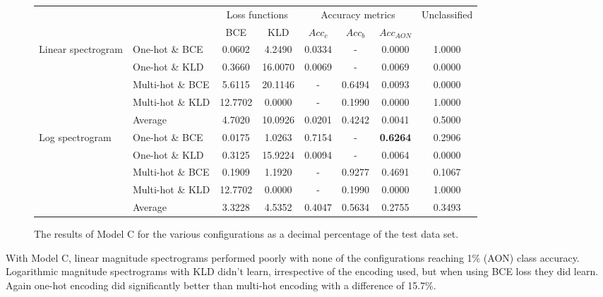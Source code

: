 \documentclass[12pt]{article}
\begin{document}
	\begin{figure}[H]
	    \centering
	    \begin{footnotesize}
    	    \begin{tabular}{l l|c|c|c|c|c|c|}
    	        & & \multicolumn{2}{c|}{Loss functions} & \multicolumn{3}{c|}{Accuracy metrics} & \multirow{2}{*}{Unclassified}\\
    	        \cline{3-7}
    	        & & BCE & KLD & $Acc_{c}$ & $Acc_{b}$ & $Acc_{AON}$ &\\
    	        \hline
    	       \multirow{4}{*}{Linear spectrogram}
    	        & One-hot \& BCE & 0.0602 & 4.2490 & 0.0334 & - & 0.0000 & 1.0000\\
    	        \cline{3-7}
    	        & One-hot \& KLD & 0.3660 & 16.0070 & 0.0069 & - & 0.0069 & 0.0000\\
    	        \cline{3-7}
    	        & Multi-hot \& BCE & 5.6115 & 20.1146 & - & 0.6494 & 0.0093 & 0.0000\\
    	        \cline{3-7}
    	        & Multi-hot \& KLD & 12.7702 & 0.0000 & - & 0.1990 & 0.0000 & 1.0000\\
    	        \bottomrule
    	        & Average & 4.7020 & 10.0926 & 0.0201 & 0.4242 & 0.0041 & 0.5000\\
    	        \bottomrule
    	       \multirow{4}{*}{Log spectrogram}
    	        & One-hot \& BCE & 0.0175 & 1.0263 & 0.7154 & - & \textbf{0.6264} & 0.2906\\
    	        \cline{3-7}
    	        & One-hot \& KLD & 0.3125 & 15.9224 & 0.0094 & - & 0.0064 & 0.0000\\
    	        \cline{3-7}
    	        & Multi-hot \& BCE & 0.1909 & 1.1920 & - & 0.9277 & 0.4691 & 0.1067\\
    	        \cline{3-7}
    	        & Multi-hot \& KLD & 12.7702 & 0.0000 & - & 0.1990 & 0.0000 & 1.0000\\
    	        \bottomrule
    	        & Average & 3.3228 & 4.5352 & 0.4047 & 0.5634 & 0.2755 & 0.3493\\
    	       \bottomrule
    	    \end{tabular}
    	\end{footnotesize}
	    \caption{The results of Model C for the various configurations as a decimal percentage of the test data set.}
	    \label{fig:modelC}
	\end{figure}
	
	With Model C, linear magnitude spectrograms performed poorly with none of the configurations reaching 1\% (AON) class accuracy. Logarithmic magnitude spectrograms with KLD didn't learn, irrespective of the encoding used, but when using BCE loss they did learn. Again one-hot encoding did significantly better than multi-hot encoding with a difference of 15.7\%.\medskip
	
\end{document}

